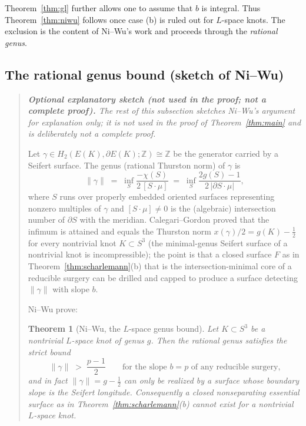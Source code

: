 \documentclass[11pt]{article}
\newtheorem{theorem}{Theorem}[section]
\theoremstyle{definition}
\theoremstyle{remark}
\newcommand{\Z}{\mathbb{Z}}
\begin{document}
Theorem~\ref{thm:gl} further allows one to assume that $b$ is integral.  Thus
Theorem~\ref{thm:niwu} follows once case (b) is ruled out for $L$-space
knots.  The exclusion is the content of Ni--Wu's work and proceeds through
the \emph{rational genus}.

\subsection{The rational genus bound (sketch of Ni--Wu)}

\begin{quote}\itshape
\noindent\textbf{Optional explanatory sketch (not used in the proof; not a
complete proof).}  The rest of this subsection sketches Ni--Wu's argument for
explanation only; it is not used in the proof of Theorem~\ref{thm:main} and is
deliberately not a complete proof.

Let $\gamma\in H_2(E(K),\partial E(K);\Z)\cong\Z$ be the generator carried by
a Seifert surface.  The genus (rational Thurston norm) of $\gamma$ is
\[
\|\gamma\|\;=\;\inf_{S}\frac{-\chi(S)}{2\,[S\!\cdot\!\mu]}
\;=\;\inf_S\frac{2g(S)-1}{2\,|\partial S\cdot\mu|},
\]
where $S$ runs over properly embedded oriented surfaces representing nonzero
multiples of $\gamma$ and $[S\!\cdot\!\mu]\ne0$ is the (algebraic) intersection
number of $\partial S$ with the meridian.  Calegari--Gordon proved that the
infimum is attained and equals the Thurston norm $x(\gamma)/2=g(K)-\tfrac12$
for every nontrivial knot $K\subset S^{3}$ (the minimal-genus Seifert surface
of a nontrivial knot is incompressible); the point is that a closed surface
$F$ as in Theorem~\ref{thm:scharlemann}(b) that is the intersection-minimal
core of a reducible surgery can be drilled and capped to produce a surface
detecting $\|\gamma\|$ with slope $b$.

Ni--Wu prove:

\begin{theorem}[Ni--Wu, the $L$-space genus bound]\label{thm:niwubound}
Let $K\subset S^3$ be a nontrivial $L$-space knot of genus $g$.  Then the
rational genus satisfies the strict bound
\[
\|\gamma\|\;>\;\frac{p-1}{2}
\qquad\text{for the slope } b=p \text{ of any reducible surgery,}
\]
and in fact $\|\gamma\|=g-\tfrac12$ can only be realized by a surface whose
boundary slope is the Seifert longitude.  Consequently a closed nonseparating
essential surface as in Theorem~\ref{thm:scharlemann}(b) cannot exist for a
nontrivial $L$-space knot.
\end{theorem}


\end{quote}
\end{document}
